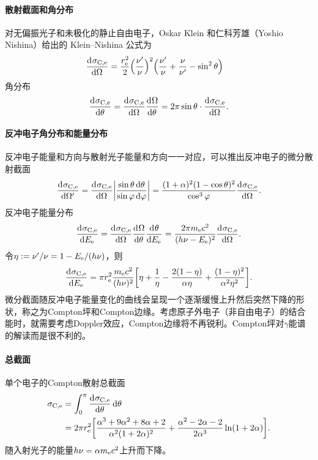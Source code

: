 \paragraph{散射截面和角分布}
对无偏振光子和未极化的静止自由电子，Oskar Klein 和仁科芳雄（Yoshio Nishina）给出的 Klein--Nishina 公式为
\begin{align}\label{eq:nrd-klein-nishina-differential}
	\frac{\mathop{}\!\mathrm{d}^{}\sigma_{\mathrm C,\mathrm{e}}}{\mathrm{d}{\Omega}^{}} &= \frac{r_{\mathrm{e}}^2}2\Bigl(\frac{\nu'}\nu\Bigr)^2\Bigl(\frac{\nu'}\nu + \frac\nu{\nu'} - \sin^2\theta\Bigr)
\end{align}
角分布
\[
	\frac{\mathop{}\!\mathrm{d}^{}\sigma_{\mathrm C,\mathrm{e}}}{\mathrm{d}{\theta}^{}} = \frac{\mathop{}\!\mathrm{d}^{}\sigma_{\mathrm C,\mathrm{e}}}{\mathrm{d}{\Omega}^{}}\frac{\mathop{}\!\mathrm{d}^{}\Omega}{\mathrm{d}{\theta}^{}} = 2\pi\sin\theta \cdot \frac{\mathop{}\!\mathrm{d}^{}\sigma_{\mathrm C,\mathrm{e}}}{\mathrm{d}{\Omega}^{}}.
\]
\paragraph{反冲电子角分布和能量分布}
反冲电子能量和方向与散射光子能量和方向一一对应，可以推出反冲电子的微分散射截面
\[
	\frac{\mathop{}\!\mathrm{d}^{}\sigma_{\mathrm C,\mathrm{e}}}{\mathrm{d}{\Omega'}^{}} = \frac{\mathop{}\!\mathrm{d}^{}\sigma_{\mathrm C,\mathrm{e}}}{\mathrm{d}{\Omega}^{}}\biggl\lvert\frac{\sin\theta\mathop{}\!\mathrm{d}\theta}{\sin\varphi\mathop{}\!\mathrm{d}\varphi}\biggr\rvert = \frac{(1 + \alpha)^2(1 - \cos\theta)^2}{\cos^3\varphi}\frac{\mathop{}\!\mathrm{d}^{}\sigma_{\mathrm C,\mathrm{e}}}{\mathrm{d}{\Omega}^{}}.
\]
反冲电子能量分布
\[
	\frac{\mathop{}\!\mathrm{d}^{}\sigma_{\mathrm C,\mathrm{e}}}{\mathrm{d}{E_{\mathrm{e}}}^{}} = \frac{\mathop{}\!\mathrm{d}^{}\sigma_{\mathrm C,\mathrm{e}}}{\mathrm{d}{\Omega}^{}}\frac{\mathop{}\!\mathrm{d}^{}\Omega}{\mathrm{d}{\theta}^{}}\frac{\mathop{}\!\mathrm{d}^{}\theta}{\mathrm{d}{E_{\mathrm{e}}}^{}} = \frac{2\pi m_{\mathrm{e}} c^2}{(h\nu - E_{\mathrm{e}})^2}\frac{\mathop{}\!\mathrm{d}^{}\sigma_{\mathrm C,\mathrm{e}}}{\mathrm{d}{\Omega}^{}}.
\]
令$\eta := \nu'/\nu = 1 - E_{\mathrm{e}}/(h\nu)$，则
\begin{equation}\label{eq:nrd-compton-recoil-spectrum}
	\frac{\mathop{}\!\mathrm{d}^{}\sigma_{\mathrm C,\mathrm{e}}}{\mathrm{d}{E_{\mathrm{e}}}^{}} = \pi r_{\mathrm{e}}^2\frac{m_{\mathrm{e}} c^2}{(h\nu)^2}\biggl[\eta + \frac1\eta - \frac{2(1 - \eta)}{\alpha\eta} + \frac{(1 - \eta)^2}{\alpha^2\eta^2}\biggr].
\end{equation}
微分截面随反冲电子能量变化的曲线会呈现一个逐渐缓慢上升然后突然下降的形状，称之为Compton坪和Compton边缘。考虑原子外电子（非自由电子）的结合能时，就需要考虑Doppler效应，Compton边缘将不再锐利。Compton坪对$\gamma$能谱的解读而是很不利的。

\paragraph{总截面}单个电子的Compton散射总截面
\begin{equation}\label{eq:nrd-klein-nishina-total}
	\begin{aligned}
		\sigma_{\mathrm C,\mathrm{e}} &= \int_0^\pi\frac{\mathop{}\!\mathrm{d}^{}\sigma_{\mathrm C,\mathrm{e}}}{\mathrm{d}{\theta}^{}}\mathop{}\!\mathrm{d}\theta\\
		&= 2\pi r_{\mathrm{e}}^2\biggl[\frac{\alpha^3 + 9\alpha^2 + 8\alpha + 2}{\alpha^2(1 + 2\alpha)^2} + \frac{\alpha^2 - 2\alpha - 2}{2\alpha^3}\ln(1 + 2\alpha)\biggr].
	\end{aligned}
\end{equation}
随入射光子的能量$h\nu = \alpha m_{\mathrm{e}} c^2$上升而下降。

